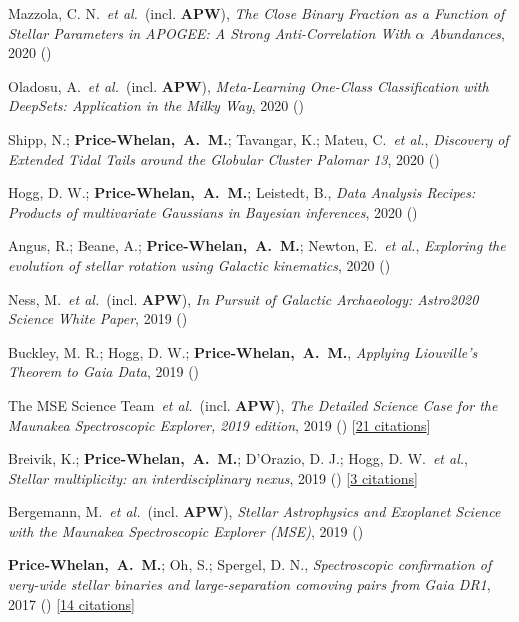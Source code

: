 \item[{\color{deemph}\scriptsize11}]Mazzola, C. N.~\textit{et al.}~(incl. \textbf{APW}), \textit{The Close Binary Fraction as a Function of Stellar Parameters in APOGEE: A Strong Anti-Correlation With $\alpha$ Abundances}, 2020 ()

\item[{\color{deemph}\scriptsize10}]Oladosu, A.~\textit{et al.}~(incl. \textbf{APW}), \textit{Meta-Learning One-Class Classification with DeepSets: Application in the Milky Way}, 2020 ()

\item[{\color{deemph}\scriptsize9}]Shipp, N.; \textbf{Price-Whelan,~A.~M.}; Tavangar, K.; Mateu, C.~\textit{et al.}, \textit{Discovery of Extended Tidal Tails around the Globular Cluster Palomar 13}, 2020 ()

\item[{\color{deemph}\scriptsize8}]Hogg, D. W.; \textbf{Price-Whelan,~A.~M.}; Leistedt, B., \textit{Data Analysis Recipes: Products of multivariate Gaussians in Bayesian inferences}, 2020 ()

\item[{\color{deemph}\scriptsize7}]Angus, R.; Beane, A.; \textbf{Price-Whelan,~A.~M.}; Newton, E.~\textit{et al.}, \textit{Exploring the evolution of stellar rotation using Galactic kinematics}, 2020 ()

\item[{\color{deemph}\scriptsize6}]Ness, M.~\textit{et al.}~(incl. \textbf{APW}), \textit{In Pursuit of Galactic Archaeology: Astro2020 Science White Paper}, 2019 ()

\item[{\color{deemph}\scriptsize5}]Buckley, M. R.; Hogg, D. W.; \textbf{Price-Whelan,~A.~M.}, \textit{Applying Liouville's Theorem to Gaia Data}, 2019 ()

\item[{\color{deemph}\scriptsize4}]The MSE Science Team~\textit{et al.}~(incl. \textbf{APW}), \textit{The Detailed Science Case for the Maunakea Spectroscopic Explorer, 2019 edition}, 2019 () [\href{http://adsabs.harvard.edu/abs/2019arXiv190404907T}{21 citations}]

\item[{\color{deemph}\scriptsize3}]Breivik, K.; \textbf{Price-Whelan,~A.~M.}; D'Orazio, D. J.; Hogg, D. W.~\textit{et al.}, \textit{Stellar multiplicity: an interdisciplinary nexus}, 2019 () [\href{http://adsabs.harvard.edu/abs/2019arXiv190305094B}{3 citations}]

\item[{\color{deemph}\scriptsize2}]Bergemann, M.~\textit{et al.}~(incl. \textbf{APW}), \textit{Stellar Astrophysics and Exoplanet Science with the Maunakea Spectroscopic Explorer (MSE)}, 2019 ()

\item[{\color{deemph}\scriptsize1}]\textbf{Price-Whelan,~A.~M.}; Oh, S.; Spergel, D. N., \textit{Spectroscopic confirmation of very-wide stellar binaries and large-separation comoving pairs from Gaia DR1}, 2017 () [\href{http://adsabs.harvard.edu/abs/2017arXiv170903532P}{14 citations}]